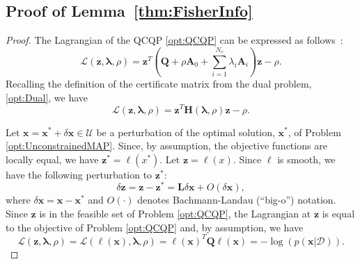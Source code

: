 \documentclass[lettersize,journal]{IEEEtran}
\begin{document}
\subsection{Proof of Lemma~\ref{thm:FisherInfo}}\label{App:lemma1Proof}
\begin{proof}
The Lagrangian of the QCQP \eqref{opt:QCQP} can be expressed as follows~\cite{boydConvexOptimization2004}:
\begin{equation*}
	\mathcal{L}(\bm{z},\bm{\lambda}, \rho) = \bm{z}^T \left(\bm{Q} + \rho\bm{A}_0 +\sum\limits_{i=1}^{N_c} \lambda_i \bm{A}_i\right) \bm{z} - \rho.
\end{equation*}
Recalling the definition of the certificate matrix from the dual problem, \eqref{opt:Dual}, we have
\begin{equation*}
	\mathcal{L}(\bm{z},\bm{\lambda}, \rho) = \bm{z}^T \bm{H}(\bm{\lambda}, \rho) \bm{z} - \rho.
\end{equation*}

Let $\bm{x} = \bm{x}^*+\delta\bm{x} \in \mathcal{U}$ be a perturbation of the optimal solution, $\bm{x}^*$, of Problem \eqref{opt:UnconstrainedMAP}. Since, by assumption, the objective functions are locally equal, we have $\bm{z}^* = \bm{\ell}(x^*)$.  Let $\bm{z}= \bm{\ell}(x)$. Since $\bm{\ell}$ is smooth, we have the following perturbation to $\bm{z}^*$:
\begin{equation}\label{eqn:z_pert}
	\delta\bm{z} = \bm{z} - \bm{z}^* = \bm{L} \delta\bm{x} + O(\delta\bm{x}),
\end{equation}
where $\delta\bm{x}=\bm{x} - \bm{x}^*$ and $O(\cdot)$ denotes Bachmann-Landau (``big-o'') notation. Since $\bm{z}$ is in the feasible set of Problem \eqref{opt:QCQP}, the Lagrangian at $\bm{z}$ is equal to the objective of Problem \eqref{opt:QCQP} and, by assumption, we have
\begin{equation*}
	\mathcal{L}(\bm{z},\bm{\lambda}, \rho) =\mathcal{L}(\bm{\ell}(\bm{x}),\bm{\lambda}, \rho)=\bm{\ell}(\bm{x})^T\bm{Q}\bm{\ell}(\bm{x}) = -\log(p(\bm{x} \vert \bm{\mathcal{D}})).
\end{equation*}


\end{proof}
\end{document}
